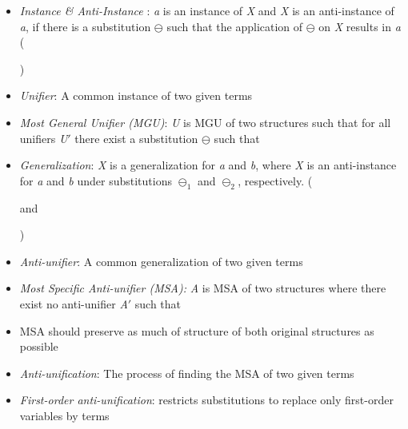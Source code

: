 \documentclass{article}
\newcommand{\itt}{\textit}
\newcommand{\vars}{\textit}
\begin{document}
\begin{itemize} [leftmargin=.1in]
\item \itt{Instance \& Anti-Instance }:  \vars{a} is an instance of \vars{X} and \vars{X} is an anti-instance of \vars{a}, if there is a substitution $\ominus$ such that the application of $\ominus$ on \vars{X} results in \vars{a} ()

\item \itt{Unifier}: A common instance of two given terms
\item \itt{Most General Unifier (MGU)}: \vars{U} is MGU of two structures such that for all unifiers \vars{U}${\prime}$ there exist a substitution $\ominus$ such that 

\item \itt{Generalization}: \vars{X} is a generalization for \vars{a} and \vars{b}, where \vars{X} is an anti-instance for  \vars{a} and \vars{b} under substitutions $\ominus_1$ and $\ominus_2$, respectively. ( and)

\item \itt{Anti-unifier}: A common generalization of two given terms
\item \itt{Most Specific Anti-unifier (MSA):} \vars{A} is MSA of two structures where there exist no anti-unifier \vars{A}${\prime}$ such that
\item MSA should preserve as much of structure of both original structures as possible
\item \itt{Anti-unification}: The process of finding the MSA of two given terms
\item \itt{First-order anti-unification}: restricts substitutions to replace only first-order variables by terms


\end{itemize}
\end{document}
